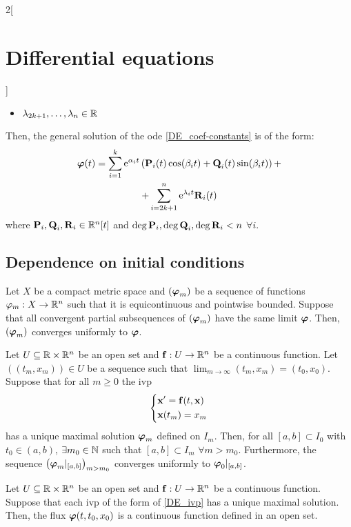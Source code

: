 \documentclass[../../../main.tex]{subfiles}
\begin{document}
\begin{multicols}{2}[\section{Differential equations}]
\begin{corollary}
\begin{itemize}
      \item $\lambda_{2k+1},\ldots,\lambda_n\in\mathbb{R}$
    \end{itemize}
    Then, the general solution of the ode \eqref{DE_coef-constants} is of the form:
    \begin{multline*}
      \boldsymbol{\mathrm{\varphi}}(t)=\sum_{i=1}^k\mathrm{e}^{\alpha_i t}\left(\boldsymbol{\mathrm{P}}_i(t)\cos(\beta_i t)+\boldsymbol{\mathrm{Q}}_i(t)\sin(\beta_i t)\right)+\\+\sum_{i=2k+1}^n\mathrm{e}^{\lambda_i t}\boldsymbol{\mathrm{R}}_i(t)
    \end{multline*}
    where $\boldsymbol{\mathrm{P}}_i,\boldsymbol{\mathrm{Q}}_i,\boldsymbol{\mathrm{R}}_i\in\mathbb{R}^n[t]$ and $\deg \boldsymbol{\mathrm{P}}_i,\deg\boldsymbol{\mathrm{Q}}_i,\deg\boldsymbol{\mathrm{R}}_i<n$ $\forall i$.
  \end{corollary}
  \subsection{Dependence on initial conditions}
  \begin{lemma}
    Let $X$ be a compact metric space and $(\boldsymbol{\mathrm{\varphi}}_m)$ be a sequence of functions $\varphi_m:X\rightarrow\mathbb{R}^n$  such that it is equicontinuous and pointwise bounded. Suppose that all convergent partial subsequences of $(\boldsymbol{\mathrm{\varphi}}_m)$ have the same limit $\boldsymbol{\mathrm{\varphi}}$. Then, $(\boldsymbol{\mathrm{\varphi}}_m)$ converges uniformly to $\boldsymbol{\mathrm{\varphi}}$.
  \end{lemma}
  \begin{prop}
    Let $U\subseteq\mathbb{R}\times\mathbb{R}^n$ be an open set and $\boldsymbol{\mathrm{f}}:U\rightarrow\mathbb{R}^n$ be a continuous function. Let $((t_m,x_m))\in U$ be a sequence such that $\displaystyle\lim_{m\to\infty}(t_m,x_m)=(t_0,x_0)$. Suppose that for all $m\geq 0$ the ivp
    $$
      \left\{
      \begin{aligned}
         & \boldsymbol{\mathrm{x}}'      =\boldsymbol{\mathrm{f}}(t,\boldsymbol{\mathrm{x}}) \\
         & \boldsymbol{\mathrm{x}}(t_m)  =x_m
      \end{aligned}
      \right.
    $$
    has a unique maximal solution $\boldsymbol{\mathrm{\varphi}}_m$ defined on $I_m$. Then, for all $[a,b]\subset I_0$ with $t_0\in(a,b)$, $\exists m_0\in\mathbb{N}$ such that $[a,b]\subset I_m$ $\forall m>m_0$. Furthermore, the sequence $\left(\boldsymbol{\mathrm{\varphi}}_m|_{[a,b]}\right)_{m>m_0}$ converges uniformly to $\boldsymbol{\mathrm{\varphi}}_0|_{[a,b]}$.
  \end{prop}
  \begin{theorem}
    Let $U\subseteq\mathbb{R}\times\mathbb{R}^n$ be an open set and $\boldsymbol{\mathrm{f}}:U\rightarrow\mathbb{R}^n$ be a continuous function. Suppose that each ivp of the form of \eqref{DE_ivp} has a unique maximal solution. Then, the flux $\boldsymbol{\mathrm{\varphi}}(t,t_0,x_0)$ is a continuous function defined in an open set.
  \end{theorem}
\end{multicols}
\end{document}
